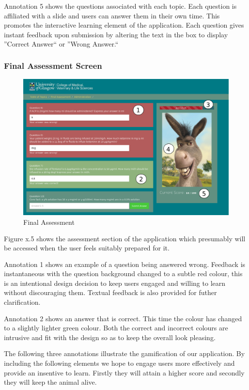 \documentclass{l3proj}
\begin{document}
Annotation 5 shows the questions associated with each topic. Each question is affiliated with a slide and users can answer them in their own time. This promotes the interactive learning element of the application. Each question gives instant feedback upon submission by altering the text in the box to display ''Correct Answer`` or ''Wrong Answer.`` 

\subsubsection{Final Assessment Screen}

\begin{figure}[!htb]
\caption{Final Assessment}
\includegraphics[width=\linewidth]{images/annotated_assessment.png}
\end{figure}

Figure x.5 shows the assessment section of the application which presumably will be accessed when the user feels suitably prepared for it.

Annotation 1 shows an example of a question being answered wrong. Feedback is instantaneous with the question background changed to a subtle red colour, this is an intentional design decision to keep users engaged and willing to learn without discouraging them. Textual feedback is also provided for futher clarification. 

Annotation 2 shows an answer that is correct. This time the colour has changed to a slightly lighter green colour. Both the correct and incorrect colours are intrusive and fit with the design so as to keep the overall look pleasing.

The following three annotations illustrate the gamification of our application. By including the following elements we hope to engage users more effectively and provide an insentive to learn. Firstly they will attain a higher score and secondly they will keep the animal alive.
\end{document}
